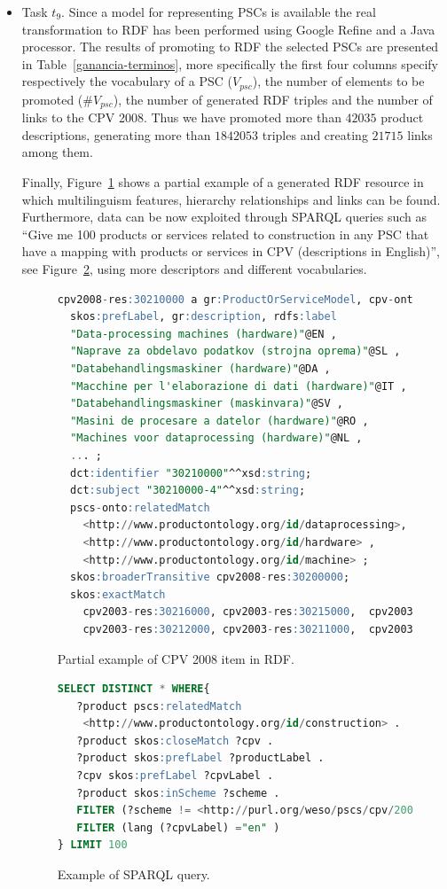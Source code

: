 \begin{itemize}
\item Task $t_9$. Since a model for representing PSCs is available the real transformation to RDF has been performed using Google Refine 
and a Java processor. The results of promoting to RDF the selected PSCs are presented in Table~\ref{ganancia-terminos}, 
more specifically the first four columns specify respectively the vocabulary of a PSC ($V_{psc}$), the number of elements 
to be promoted (\#$V_{psc}$), the number of generated RDF triples and the number of links to the CPV 2008. 
Thus we have promoted more than $42035$ product descriptions, generating more than $1842053$ triples and creating $21715$ 
links among them. 

Finally, Figure~\ref{fig:example-cpv-code} shows a partial example of a generated RDF resource in which multilinguism features, 
hierarchy relationships and links can be found. Furthermore, data can be now exploited through SPARQL queries 
such as ``Give me 100 products or services related to construction in any PSC that have a mapping with products or 
services in CPV (descriptions in English)'', see Figure~\ref{fig:example-sparql-query}, using more descriptors and 
different vocabularies.

\begin{figure}[!ht]
\begin{lstlisting}[language=SQL,basicstyle=\ttfamily\scriptsize]  
cpv2008-res:30210000 a gr:ProductOrServiceModel, cpv-onto:Group;
  skos:prefLabel, gr:description, rdfs:label 	
  "Data-processing machines (hardware)"@EN ,
  "Naprave za obdelavo podatkov (strojna oprema)"@SL , 
  "Databehandlingsmaskiner (hardware)"@DA ,
  "Macchine per l'elaborazione di dati (hardware)"@IT ,
  "Databehandlingsmaskiner (maskinvara)"@SV ,
  "Masini de procesare a datelor (hardware)"@RO ,   
  "Machines voor dataprocessing (hardware)"@NL , 
  ... ;
  dct:identifier "30210000"^^xsd:string;
  dct:subject "30210000-4"^^xsd:string;
  pscs-onto:relatedMatch   
    <http://www.productontology.org/id/dataprocessing>,
    <http://www.productontology.org/id/hardware> ,
    <http://www.productontology.org/id/machine> ;	
  skos:broaderTransitive cpv2008-res:30200000;
  skos:exactMatch 
    cpv2003-res:30216000, cpv2003-res:30215000,  cpv2003-res:30213000,   
    cpv2003-res:30212000, cpv2003-res:30211000,  cpv2003-res:30214000.
\end{lstlisting}
\caption{Partial example of CPV 2008 item in RDF.}
 \label{fig:example-cpv-code}
\end{figure}


\begin{figure}[!ht]
\begin{lstlisting}[language=SQL,basicstyle=\ttfamily\scriptsize]  
SELECT DISTINCT * WHERE{
   ?product pscs:relatedMatch 
    <http://www.productontology.org/id/construction> .
   ?product skos:closeMatch ?cpv .
   ?product skos:prefLabel ?productLabel .
   ?cpv skos:prefLabel ?cpvLabel .
   ?product skos:inScheme ?scheme .
   FILTER (?scheme != <http://purl.org/weso/pscs/cpv/2008/resource/ds>) .
   FILTER (lang (?cpvLabel) ="en" )
} LIMIT 100
\end{lstlisting}
\caption{Example of SPARQL query.}
 \label{fig:example-sparql-query}
\end{figure}



\end{itemize}
